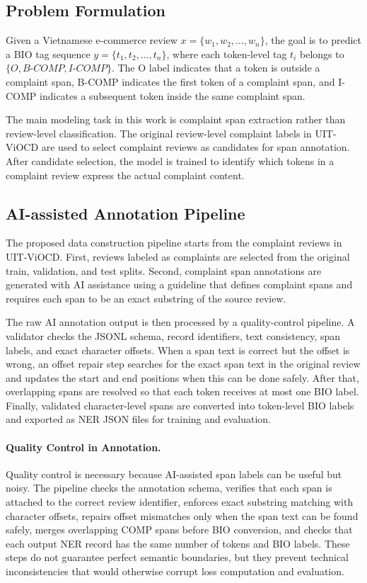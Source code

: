 \documentclass[11pt]{article}
\begin{document}
\subsection{Problem Formulation}

Given a Vietnamese e-commerce review \(x = \{w_1, w_2, \ldots, w_n\}\), the goal is to predict a BIO tag sequence \(y = \{t_1, t_2, \ldots, t_n\}\), where each token-level tag \(t_i\) belongs to \(\{O, B\text{-}COMP, I\text{-}COMP\}\). The O label indicates that a token is outside a complaint span, B-COMP indicates the first token of a complaint span, and I-COMP indicates a subsequent token inside the same complaint span.

The main modeling task in this work is complaint span extraction rather than review-level classification. The original review-level complaint labels in UIT-ViOCD are used to select complaint reviews as candidates for span annotation. After candidate selection, the model is trained to identify which tokens in a complaint review express the actual complaint content.

\subsection{AI-assisted Annotation Pipeline}

The proposed data construction pipeline starts from the complaint reviews in UIT-ViOCD. First, reviews labeled as complaints are selected from the original train, validation, and test splits. Second, complaint span annotations are generated with AI assistance using a guideline that defines complaint spans and requires each span to be an exact substring of the source review.

The raw AI annotation output is then processed by a quality-control pipeline. A validator checks the JSONL schema, record identifiers, text consistency, span labels, and exact character offsets. When a span text is correct but the offset is wrong, an offset repair step searches for the exact span text in the original review and updates the start and end positions when this can be done safely. After that, overlapping spans are resolved so that each token receives at most one BIO label. Finally, validated character-level spans are converted into token-level BIO labels and exported as NER JSON files for training and evaluation.

\paragraph{Quality Control in Annotation.}
Quality control is necessary because AI-assisted span labels can be useful but noisy. The pipeline checks the annotation schema, verifies that each span is attached to the correct review identifier, enforces exact substring matching with character offsets, repairs offset mismatches only when the span text can be found safely, merges overlapping COMP spans before BIO conversion, and checks that each output NER record has the same number of tokens and BIO labels. These steps do not guarantee perfect semantic boundaries, but they prevent technical inconsistencies that would otherwise corrupt loss computation and evaluation.
\end{document}
